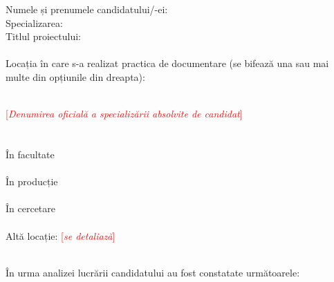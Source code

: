     \begin{singlespace}
        \fontsize{11}{11}\selectfont
        \begin{minipage}{.4\textwidth}
            Numele și prenumele candidatului/-ei:\\
            Specializarea:\\
            Titlul proiectului: \\~\\
            Locația în care s-a realizat practica de documentare (se bifează una sau mai multe din opțiunile din dreapta):
          \end{minipage}\hfill
          \begin{minipage}{.55\textwidth}
            \phantom{.}
        \\[4\baselineskip]
            \textcolor{red}{[\textit{Denumirea oficială a specializării absolvite de candidat}]\\}\\~\\
            În facultate   \\~\\
            În producție  \\~\\
            În cercetare   \\~\\
            Altă locație:  \textcolor{red}{[\textit{se detaliază}]}

          \end{minipage}
          \\[3\baselineskip]
        În urma analizei lucrării candidatului au fost constatate următoarele:\\~\\
        

\end{singlespace}

